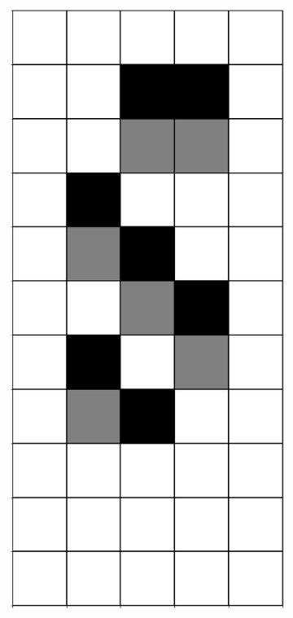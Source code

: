 \documentclass[12pt]{article}
\numberwithin{figure}{section} %
\begin{document}
\begin{figure}[H]
\begin{subfigure}{0.3\textwidth}
     \subcaption{}
   \end{subfigure}
        \begin{subfigure}{0.3\textwidth}
     \centering
     \includegraphics[angle=270,width=\linewidth]{Section4/4.2}

\end{subfigure}
\end{figure}
\end{document}
